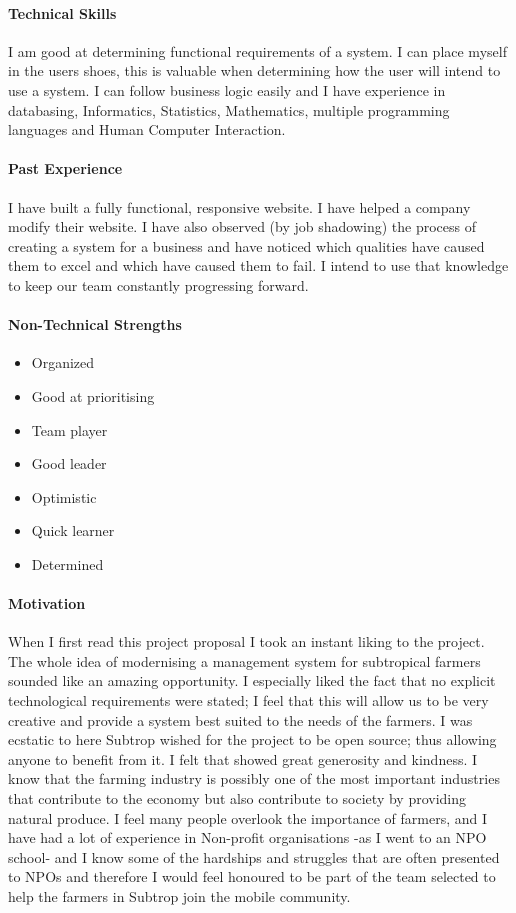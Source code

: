 \documentclass[english]{article}
\begin{document}
		\paragraph{Technical Skills}
		I am good at determining functional requirements of a system. I can place myself in the users shoes, this is valuable when determining how the user will intend to use a system. I can follow business logic easily and I have experience in databasing, Informatics, Statistics, Mathematics, multiple programming languages and Human Computer Interaction.
		
		\paragraph{Past Experience}
		I have built a fully functional, responsive website. I have helped a company modify their website. I have also observed (by job shadowing) the process of creating a system for a business and have noticed which qualities have caused them to excel and which have caused them to fail. I intend to use that knowledge to keep our team constantly progressing forward.
		
		\paragraph{Non-Technical Strengths}
		\begin{itemize}
			\setlength\itemsep{0.2em}
			\item Organized
			\item Good at prioritising 
			\item Team player
			\item Good leader
			\item Optimistic
			\item Quick learner
			\item Determined
		\end{itemize}
		
		\paragraph{Motivation}
		When I first read this project proposal I took an instant liking to the project. The whole idea of modernising a management system for subtropical farmers sounded like an amazing opportunity. I especially liked the fact that no explicit technological requirements were stated; I feel that this will allow us to be very creative and provide a system best suited to the needs of the farmers. I was ecstatic to here Subtrop wished for the project to be open source; thus allowing anyone to benefit from it. I felt that showed great generosity and kindness. I know that the farming industry is possibly one of the most important industries that contribute to the economy but also contribute to society by providing natural produce. I feel many people overlook the importance of farmers, and I have had a lot of experience in Non-profit organisations -as I went to an NPO school- and I know some of the hardships and struggles that are often presented to NPOs and therefore I would feel honoured to be part of the team selected to help the farmers in Subtrop join the mobile community.
		
\end{document}
